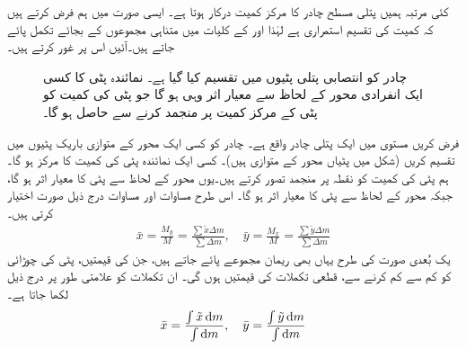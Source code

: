 کئی  مرتبہ ہمیں پتلی مسطح  چادر کا مرکز کمیت درکار ہوتا ہے۔ ایسی صورت میں ہم فرض کرتے ہیں کہ کمیت کی تقسیم استمراری ہے لہٰذا  اور  کے کلیات میں متناہی مجموعوں کے بجائے تکمل پائے جاتے ہیں۔آئیں اس پر غور کرتے ہیں۔
\begin{figure}
\centering
{}
\caption
{چادر کو انتصابی پتلی پٹیوں میں تقسیم کیا گیا ہے۔ نمائندہ پٹی کا کسی ایک انفرادی محور کے لحاظ سے معیار اثر وہی ہو گا جو پٹی کی کمیت  کو پٹی کے  مرکز کمیت پر منجمد کرنے سے حاصل ہو گا۔}
\label{شکل_تکمل_استعمال_چادر_انتصابی_پٹی_مرکز_کمیت}
\end{figure}
فرض کریں مستوی   میں ایک پتلی چادر واقع ہے۔ چادر کو کسی ایک محور کے متوازی باریک پٹیوں میں تقسیم کریں (شکل  میں پٹیاں محور  کے متوازی ہیں)۔ کسی ایک نمائندہ پٹی کی کمیت کا مرکز  ہو گا۔ ہم پٹی کی کمیت  کو نقطہ  پر منجمد تصور کرتے ہیں۔یوں محور  کے لحاظ سے پٹی کا معیار اثر  ہو گا، جبکہ محور  کے لحاظ سے پٹی کا معیار اثر  ہو گا۔ اس طرح مساوات  اور مساوات  درج ذیل صورت اختیار کرتی  ہیں۔
\begin{align*}
\bar{x}=\frac{M_y}{M}=\frac{\sum \tilde{x}\Delta m}{\sum \Delta m},\quad \bar{y}=\frac{M_x}{M}=\frac{\sum \tilde{y}\Delta m}{\sum \Delta m}
\end{align*}
یک بُعدی صورت کی طرح یہاں بھی ریمان مجموعے پائے جاتے ہیں، جن کی قیمتیں، پٹی کی چوڑائی کو  کم سے کم کرنے سے، قطعی تکملات کی قیمتیں ہوں گی۔ ان تکملات کو علامتی  طور پر درج ذیل لکھا جاتا ہے۔
\begin{align*}
\bar{x}=\frac{\int \tilde{x}\dif m}{\int \dif m},\quad \bar{y}=\frac{\int\tilde{y}\dif m}{\int\dif m}
\end{align*} 


